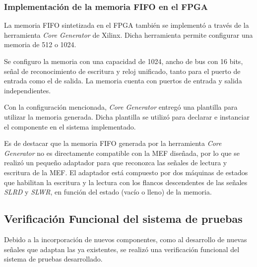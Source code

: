 	\subsubsection{Implementación de la memoria FIFO en el FPGA}
		La memoria FIFO sintetizada en el FPGA también se implementó a través de la herramienta {\it Core Generator} de Xilinx. Dicha herramienta permite configurar una memoria de \si{512} o \SI{1024}{\byte}. 
		
		Se configuro la memoria con una capacidad de \SI{1024}{\byte}, ancho de bus con 16 bits, señal de reconocimiento de escritura y reloj unificado, tanto para el puerto de entrada como el de salida.
		La memoria cuenta con puertos de entrada y salida independientes. 
		
		Con la configuración mencionada, {\it Core Generator} entregó una plantilla para utilizar la memoria generada. Dicha plantilla se utilizó para declarar e instanciar el componente en el sistema implementado. 
		
		
		Es de destacar que la memoria FIFO generada por la herramienta \textit{Core Generator} no es directamente compatible con la MEF diseñada, por lo que se realizó un pequeño adaptador para que reconozca las señales de lectura y escritura de la MEF. El adaptador está compuesto por dos máquinas de estados que habilitan la escritura y la lectura con los flancos descendentes de las señales \textit{SLRD} y \textit{SLWR}, en función del estado (vacío o lleno) de la memoria.
		
\subsection{Verificación Funcional del sistema de pruebas}
	Debido a la incorporación de nuevos componentes, como al desarrollo de nuevas señales que adaptan las ya existentes, se realizó una verificación funcional del sistema de pruebas desarrollado.
	
